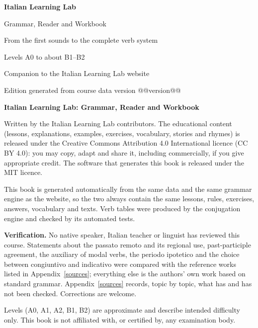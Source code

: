 \frontmatter
\begin{titlepage}
\centering
\vspace*{30mm}
{\sffamily\bfseries\color{accent}\fontsize{40}{44}\selectfont Italian Learning Lab\par}
\vspace{10mm}
{\sffamily\LARGE Grammar, Reader and Workbook\par}
\vspace{6mm}
{\large From the first sounds to the complete verb system\par}
\vspace{4mm}
{\large\color{muted} Levels A0 to about B1--B2\par}
\vfill
{\large Companion to the Italian Learning Lab website\par}
\vspace{4mm}
{\color{muted}Edition generated from course data version @@version@@\par}
\vspace{20mm}
\end{titlepage}

\thispagestyle{empty}
\vspace*{\fill}
{\small
\textbf{Italian Learning Lab: Grammar, Reader and Workbook}

Written by the Italian Learning Lab contributors. The educational content (lessons, explanations, examples, exercises, vocabulary, stories and rhymes) is released under the Creative Commons Attribution 4.0 International licence (CC BY 4.0): you may copy, adapt and share it, including commercially, if you give appropriate credit. The software that generates this book is released under the MIT licence.

This book is generated automatically from the same data and the same grammar engine as the website, so the two always contain the same lessons, rules, exercises, answers, vocabulary and texts. Verb tables were produced by the conjugation engine and checked by its automated tests.

\textbf{Verification.} No native speaker, Italian teacher or linguist has reviewed this course. Statements about the passato remoto and its regional use, past-participle agreement, the auxiliary of modal verbs, the periodo ipotetico and the choice between congiuntivo and indicativo were compared with the reference works listed in Appendix~\ref{sources}; everything else is the authors' own work based on standard grammar. Appendix~\ref{sources} records, topic by topic, what has and has not been checked. Corrections are welcome.

Levels (A0, A1, A2, B1, B2) are approximate and describe intended difficulty only. This book is not affiliated with, or certified by, any examination body.
}
\clearpage

